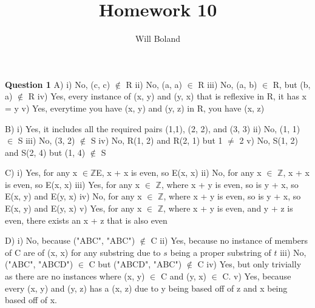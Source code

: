 \documentclass{article}
\begin{document}
\title{Homework 10}
\author{Will Boland}
\maketitle

\textbf{Question 1}\newline
A) i) No, (c, c) $\notin$ R\newline
ii) No, (a, a) $\in$ R\newline
iii) No, (a, b) $\in$ R, but (b, a) $\notin$ R\newline
iv) Yes, every instance of (x, y) and (y, x) that is reflexive in R, it has x = y\newline
v) Yes, everytime you have (x, y) and (y, z) in R, you have (x, z) \newline\newline

B) i) Yes, it includes all the required pairs (1,1), (2, 2), and (3, 3)\newline
ii) No, (1, 1) $\in$ S\newline
iii) No, (3, 2) $\notin$ S\newline
iv) No, R(1, 2) and R(2, 1) but 1 $\neq$ 2\newline
v) No, S(1, 2) and S(2, 4) but (1, 4) $\notin$ S\newline\newline

C) i) Yes, for any x $\in$$\mathbb{Z}$E, x + x is even, so E(x, x)\newline
ii) No, for any x $\in$ $\mathbb{Z}$, x + x is even, so E(x, x)\newline
iii) Yes, for any x $\in$ $\mathbb{Z}$, where x + y is even, so is y + x, so E(x, y) and E(y, x)\newline
iv) No, for any x $\in$ $\mathbb{Z}$, where x + y is even, so is y + x, so E(x, y) and E(y, x)\newline
v) Yes, for any x $\in$ $\mathbb{Z}$, where x + y is even, and y + z is even, there exists an x + z that is also even\newline\newline
 
D) i) No, because ("ABC", "ABC") $\notin$ C\newline
ii) Yes, because no instance of members of C are of (x, x) for any substring due to $s$ being a proper substring of $t$\newline
iii) No, ("ABC", "ABCD") $\in$ C but ("ABCD", "ABC") $\notin$ C\newline
iv) Yes, but only trivially as there are no instances where (x, y) $\in$ C and (y, x) $\in$ C.\newline
v) Yes, because every (x, y) and (y, z) has a (x, z) due to y being based off of z and x being based off of x.\newline\newline
\end{document}
